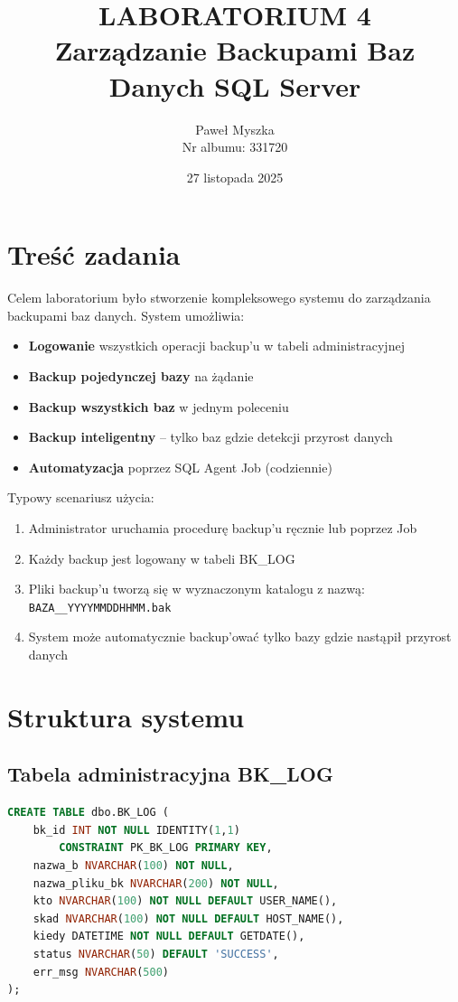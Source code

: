 \documentclass[a4paper,11pt]{article}
\title{LABORATORIUM 4\\
	\Large Zarządzanie Backupami Baz Danych SQL Server}
\author{Paweł Myszka\\
	Nr albumu: 331720}
\date{27 listopada 2025}
\begin{document}
	
	\maketitle
	\thispagestyle{fancy}
	
	\section{Treść zadania}
	
	Celem laboratorium było stworzenie kompleksowego systemu do zarządzania backupami baz danych. System umożliwia:
	\begin{itemize}
		\item \textbf{Logowanie} wszystkich operacji backup'u w tabeli administracyjnej
		\item \textbf{Backup pojedynczej bazy} na żądanie
		\item \textbf{Backup wszystkich baz} w jednym poleceniu
		\item \textbf{Backup inteligentny} -- tylko baz gdzie detekcji przyrost danych
		\item \textbf{Automatyzacja} poprzez SQL Agent Job (codziennie)
	\end{itemize}
	
	Typowy scenariusz użycia:
	\begin{enumerate}
		\item Administrator uruchamia procedurę backup'u ręcznie lub poprzez Job
		\item Każdy backup jest logowany w tabeli BK\_LOG
		\item Pliki backup'u tworzą się w wyznaczonym katalogu z nazwą: \texttt{BAZA\_\_YYYYMMDDHHMM.bak}
		\item System może automatycznie backup'ować tylko bazy gdzie nastąpił przyrost danych
	\end{enumerate}
	
	\section{Struktura systemu}
	
	\subsection{Tabela administracyjna BK\_LOG}
	
	\begin{lstlisting}[language=SQL]
CREATE TABLE dbo.BK_LOG (
	bk_id INT NOT NULL IDENTITY(1,1) 
		CONSTRAINT PK_BK_LOG PRIMARY KEY,
	nazwa_b NVARCHAR(100) NOT NULL,
	nazwa_pliku_bk NVARCHAR(200) NOT NULL,
	kto NVARCHAR(100) NOT NULL DEFAULT USER_NAME(),
	skad NVARCHAR(100) NOT NULL DEFAULT HOST_NAME(),
	kiedy DATETIME NOT NULL DEFAULT GETDATE(),
	status NVARCHAR(50) DEFAULT 'SUCCESS',
	err_msg NVARCHAR(500)
);
	\end{lstlisting}
	
\end{document}
